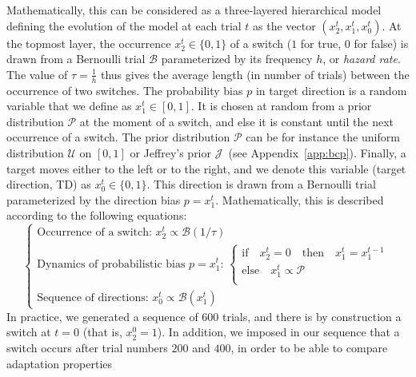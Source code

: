 \documentclass[12pt,english]{article}%
\newcommand{\choice}[1]{ %
	\left\{ %
		\begin{array}{l} #1 \end{array} %
	\right. }
\newcommand{\eql}[1]{\begin{equation}#1\end{equation}}
\newcommand{\Bb}{\mathcal{B}}
\newcommand{\Jj}{\mathcal{J}}
\newcommand{\Pp}{\mathcal{P}}
\newcommand{\Uu}{\mathcal{U}}
\newcommand{\seeApp}[1]{Appendix~\ref{app:#1}}
\begin{document}
Mathematically, this can be considered as a three-layered hierarchical model
defining the evolution of the model at each trial $t$ as the vector  $(x_2^t, x_1^t, x_0^t)$.
At the topmost layer,
the occurrence $x_2^t \in \{ 0, 1 \}$ of a switch ($1$ for true, $0$ for false)
is  drawn from a Bernoulli trial $\Bb$ parameterized by its frequency $h$, or \emph{hazard rate}.
The value of $\tau=\frac 1 h$ thus gives the average length (in number of trials)
between the occurrence of two switches.
The probability bias $p$ in target direction is a random variable that we define as $x_1^t \in [0, 1]$.
It is chosen at random from a prior distribution $\Pp$
at the moment of a switch,
and else it is constant until the next occurrence of a switch.
The prior distribution $\Pp$ can be for instance
the uniform distribution $\Uu$ on $ [ 0, 1 ] $ or
Jeffrey's prior $\Jj$~(see \seeApp{bcp}).
Finally, a target moves either to the left or to the right,
and we denote this variable (target direction, TD) as $x_0^t \in \{ 0, 1 \}$.
This direction is drawn from a Bernoulli trial
parameterized by the direction bias $p=x_1^t$.
Mathematically, this is  described according to the following equations:
 \eql{\choice{
\text{Occurrence of a switch: } x_2^t \propto \Bb(1/\tau) \\
\text{Dynamics of probabilistic bias $p=x_1^t$: }
 \choice{\text{if} \quad x_2^t=0 \quad \text{then} \quad  x_1^t = x_1^{t-1} \\
 \text{else} \quad x_1^t \propto \Pp  \\
 } \\
\text{Sequence of directions: } x_0^t \propto \Bb(x_1^t)
 }\label{eq:bsm}}
In practice, we generated a sequence of $600$ trials,
and there is by construction a switch at $t=0$ (that is, $x_2^0=1$).
In addition, we imposed in our sequence that a switch
occurs after trial numbers $200$ and $400$,
in order to be able to compare adaptation properties 
\end{document}
